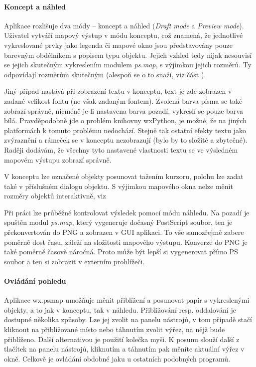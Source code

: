 \documentclass[a4paper,12pt,draft]{article}
\newcommand{\modul}[1]{\emph{#1}}
\begin{document}
\paragraph*{Koncept a náhled}
Aplikace rozlišuje dva módy -- koncept a náhled (\emph{Draft mode} a \emph{Preview mode}). 
Uživatel vytváří mapový výstup v módu konceptu, což znamená, že jednotlivé vykreslované prvky jako legenda či mapové okno jsou představovány pouze barevným obdélníkem s popisem typu objektu. Jejich vzhled tedy nijak nesouvisí se jejich skutečným vykreslením modulem \modul{ps.map}, s výjimkou jejich rozměrů. Ty odpovídají rozměrům skutečným (alespoň se o to snaží, viz část ). 

Jiný případ nastává při zobrazení textu v konceptu, text je zde zobrazen v zadané velikost fontu (ne však zadaným fontem). Zvolená barva písma se také zobrazí správně, nicméně je-li nastavena barva pozadí, vykreslí se pouze barva bílá. Pravděpodobně jde o problém knihovny wxPython, je možné, že na jiných platformách k tomuto problému nedochází. Stejně tak ostatní efekty textu jako zvýraznění a rámeček se v konceptu nezobrazují (bylo by to složité a zbytečné). Raději dodávám, že všechny tyto nastavené vlastnosti textu se ve výsledném mapovém výstupu zobrazí správně.

V konceptu lze označené objekty posunovat tažením kurzoru, polohu lze zadat také v příslušném dialogu objektu. S výjimkou mapového okna nelze měnit rozměry objektů interaktivně, viz 

Při práci lze průběžně kontrolovat výsledek pomocí módu náhledu. Na pozadí je spuštěn modul \modul{ps.map}, který vygeneruje dočasný PostScript soubor, ten je překonvertován do PNG a zobrazen v GUI aplikaci. To vše samozřejmě zabere poměrně dost času, záleží na složitosti mapového výstupu. Konverze do PNG je také poměrně časově náročná. Proto může být lepší si vygenerovat přímo PS soubor a ten si zobrazit v externím prohlížeči.

\paragraph*{Ovládání pohledu}
Aplikace wx.psmap umožňuje měnit přiblížení a posunovat papír s vykreslenými objekty, a to jak v konceptu, tak v náhledu. Přibližování resp. oddalování je dostupné několika způsoby. Lze jej zvolit na panelu nástrojů, v tom případě stačí kliknout na přibližované místo nebo táhnutím zvolit výřez, na nějž bude přiblíženo. Další alternativou je použití kolečka myši. K posunu slouží další z tlačítek na panelu nástrojů, kliknutím a táhnutím pak měníte aktuální výřez v okně. Celkově je ovládání obdobné jaku u ostatních podobných programů.
\end{document}
